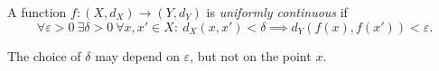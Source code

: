 
A function $f:(X,d_X)\to(Y,d_Y)$ is \emph{uniformly continuous} if
\[
\forall\varepsilon>0\ \exists\delta>0\
\forall x,x'\in X:\
d_X(x,x')<\delta\implies d_Y(f(x),f(x'))<\varepsilon.
\]

The choice of $\delta$ may depend on $\varepsilon$, but not on the point $x$.
